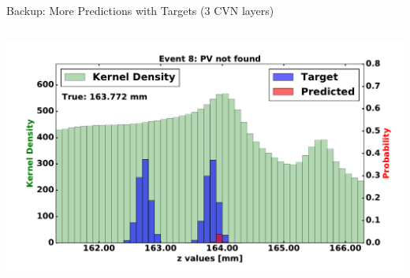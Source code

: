 \begin{frame}{Backup: More Predictions with Targets (3 CVN layers)}
\begin{columns}[c]
\begin{center}
           \includegraphics[width=1\textwidth, height=0.45\textwidth, trim=18 0 18 0]{images/120000_3layer_52.pdf}
       \end{center}
  \end{columns}
\end{frame}

